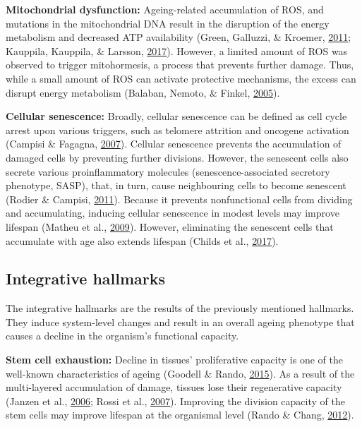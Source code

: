 \documentclass[12pt,twoside]{unicam}
\begin{document}
\textbf{Mitochondrial dysfunction:} Ageing-related accumulation of ROS, and mutations in the mitochondrial DNA result in the disruption of the energy metabolism and decreased ATP availability (Green, Galluzzi, \& Kroemer, \protect\hyperlink{ref-Green2011}{2011}; Kauppila, Kauppila, \& Larsson, \protect\hyperlink{ref-Kauppila2017}{2017}). However, a limited amount of ROS was observed to trigger mitohormesis, a process that prevents further damage. Thus, while a small amount of ROS can activate protective mechanisms, the excess can disrupt energy metabolism (Balaban, Nemoto, \& Finkel, \protect\hyperlink{ref-Balaban2005}{2005}).

\textbf{Cellular senescence:} Broadly, cellular senescence can be defined as cell cycle arrest upon various triggers, such as telomere attrition and oncogene activation (Campisi \& Fagagna, \protect\hyperlink{ref-Campisi2007}{2007}). Cellular senescence prevents the accumulation of damaged cells by preventing further divisions. However, the senescent cells also secrete various proinflammatory molecules (senescence-associated secretory phenotype, SASP), that, in turn, cause neighbouring cells to become senescent (Rodier \& Campisi, \protect\hyperlink{ref-Rodier2011}{2011}). Because it prevents nonfunctional cells from dividing and accumulating, inducing cellular senescence in modest levels may improve lifespan (Matheu et al., \protect\hyperlink{ref-Matheu2009}{2009}). However, eliminating the senescent cells that accumulate with age also extends lifespan (Childs et al., \protect\hyperlink{ref-Childs2017}{2017}).

\hypertarget{integrative-hallmarks}{%
\subsection{Integrative hallmarks}\label{integrative-hallmarks}}

The integrative hallmarks are the results of the previously mentioned hallmarks. They induce system-level changes and result in an overall ageing phenotype that causes a decline in the organism's functional capacity.

\textbf{Stem cell exhaustion:} Decline in tissues' proliferative capacity is one of the well-known characteristics of ageing (Goodell \& Rando, \protect\hyperlink{ref-Goodell2015}{2015}). As a result of the multi-layered accumulation of damage, tissues lose their regenerative capacity (Janzen et al., \protect\hyperlink{ref-Janzen2006}{2006}; Rossi et al., \protect\hyperlink{ref-Rossi2007}{2007}). Improving the division capacity of the stem cells may improve lifespan at the organismal level (Rando \& Chang, \protect\hyperlink{ref-Rando2012}{2012}).
\end{document}
